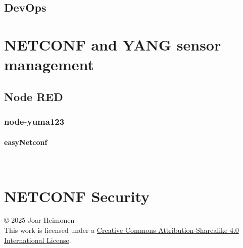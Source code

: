 \documentclass[12pt]{article}
\newcommand{\subsubsubsection}[1]{\paragraph{#1}\mbox{}\\}
\newcommand{\license}{
    \vspace{1em}
    \noindent\small{© 2025 Joar Heimonen\\
    This work is licensed under a \href{https://creativecommons.org/licenses/by-sa/4.0/}{Creative Commons Attribution-Sharealike 4.0 International License}.}
}
\begin{document}
\subsection{DevOps}


\section{NETCONF and YANG sensor management}

\subsection{Node RED}
\subsubsection{node-yuma123}
\subsubsubsection{easyNetconf}

\section{NETCONF Security}

\pagebreak
{}
\printbibliography
\license
\end{document}
